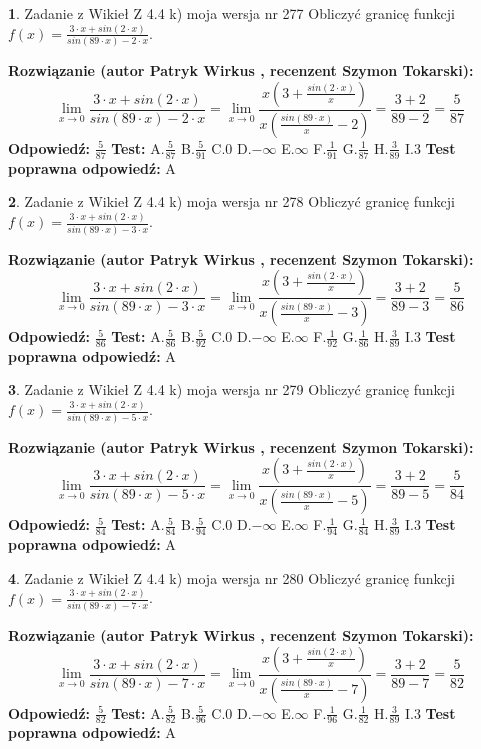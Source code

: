 \documentclass[12pt, a4paper]{article}
\theoremstyle{definition} %
\newtheorem{zad}{}
\newcommand{\zadStart}[1]{\begin{zad}#1\newline}
\newcommand{\zadStop}{\end{zad}}
\newcommand{\rozwStart}[2]{\noindent \textbf{Rozwiązanie (autor #1 , recenzent #2): }\newline}
\newcommand{\rozwStop}{\newline}
\newcommand{\odpStart}{\noindent \textbf{Odpowiedź:}\newline}
\newcommand{\odpStop}{\newline}
\newcommand{\testStart}{\noindent \textbf{Test:}\newline}
\newcommand{\testStop}{\newline}
\newcommand{\kluczStart}{\noindent \textbf{Test poprawna odpowiedź:}\newline}
\newcommand{\kluczStop}{\newline}
\begin{document}
\zadStart{Zadanie z Wikieł Z 4.4 k) moja wersja nr 277}
Obliczyć granicę funkcji $f(x)=\frac{3\cdot x +sin(2\cdot x)}{sin(89\cdot x) -2\cdot x}$.
\zadStop
\rozwStart{Patryk Wirkus}{Szymon Tokarski}
$$\lim\limits_{x\to 0}\frac{3\cdot x +sin(2\cdot x)}{sin(89\cdot x) -2\cdot x}
=\lim\limits_{x\to 0}\frac{x(3+\frac{sin(2\cdot x)}{x})}{x(\frac{sin(89\cdot x)}{x}-2)}
=\frac{3+2}{89-2} = \frac{5}{87}$$
\rozwStop
\odpStart
$\frac{5}{87}$
\odpStop
\testStart
A.$\frac{5}{87}$
B.$\frac{5}{91}$
C.$0$
D.$-\infty$
E.$\infty$
F.$\frac{1}{91}$
G.$\frac{1}{87}$
H.$\frac{3}{89}$
I.$3$
\testStop
\kluczStart
A
\kluczStop



\zadStart{Zadanie z Wikieł Z 4.4 k) moja wersja nr 278}
Obliczyć granicę funkcji $f(x)=\frac{3\cdot x +sin(2\cdot x)}{sin(89\cdot x) -3\cdot x}$.
\zadStop
\rozwStart{Patryk Wirkus}{Szymon Tokarski}
$$\lim\limits_{x\to 0}\frac{3\cdot x +sin(2\cdot x)}{sin(89\cdot x) -3\cdot x}
=\lim\limits_{x\to 0}\frac{x(3+\frac{sin(2\cdot x)}{x})}{x(\frac{sin(89\cdot x)}{x}-3)}
=\frac{3+2}{89-3} = \frac{5}{86}$$
\rozwStop
\odpStart
$\frac{5}{86}$
\odpStop
\testStart
A.$\frac{5}{86}$
B.$\frac{5}{92}$
C.$0$
D.$-\infty$
E.$\infty$
F.$\frac{1}{92}$
G.$\frac{1}{86}$
H.$\frac{3}{89}$
I.$3$
\testStop
\kluczStart
A
\kluczStop



\zadStart{Zadanie z Wikieł Z 4.4 k) moja wersja nr 279}
Obliczyć granicę funkcji $f(x)=\frac{3\cdot x +sin(2\cdot x)}{sin(89\cdot x) -5\cdot x}$.
\zadStop
\rozwStart{Patryk Wirkus}{Szymon Tokarski}
$$\lim\limits_{x\to 0}\frac{3\cdot x +sin(2\cdot x)}{sin(89\cdot x) -5\cdot x}
=\lim\limits_{x\to 0}\frac{x(3+\frac{sin(2\cdot x)}{x})}{x(\frac{sin(89\cdot x)}{x}-5)}
=\frac{3+2}{89-5} = \frac{5}{84}$$
\rozwStop
\odpStart
$\frac{5}{84}$
\odpStop
\testStart
A.$\frac{5}{84}$
B.$\frac{5}{94}$
C.$0$
D.$-\infty$
E.$\infty$
F.$\frac{1}{94}$
G.$\frac{1}{84}$
H.$\frac{3}{89}$
I.$3$
\testStop
\kluczStart
A
\kluczStop



\zadStart{Zadanie z Wikieł Z 4.4 k) moja wersja nr 280}
Obliczyć granicę funkcji $f(x)=\frac{3\cdot x +sin(2\cdot x)}{sin(89\cdot x) -7\cdot x}$.
\zadStop
\rozwStart{Patryk Wirkus}{Szymon Tokarski}
$$\lim\limits_{x\to 0}\frac{3\cdot x +sin(2\cdot x)}{sin(89\cdot x) -7\cdot x}
=\lim\limits_{x\to 0}\frac{x(3+\frac{sin(2\cdot x)}{x})}{x(\frac{sin(89\cdot x)}{x}-7)}
=\frac{3+2}{89-7} = \frac{5}{82}$$
\rozwStop
\odpStart
$\frac{5}{82}$
\odpStop
\testStart
A.$\frac{5}{82}$
B.$\frac{5}{96}$
C.$0$
D.$-\infty$
E.$\infty$
F.$\frac{1}{96}$
G.$\frac{1}{82}$
H.$\frac{3}{89}$
I.$3$
\testStop
\kluczStart
A
\kluczStop
\end{document}
